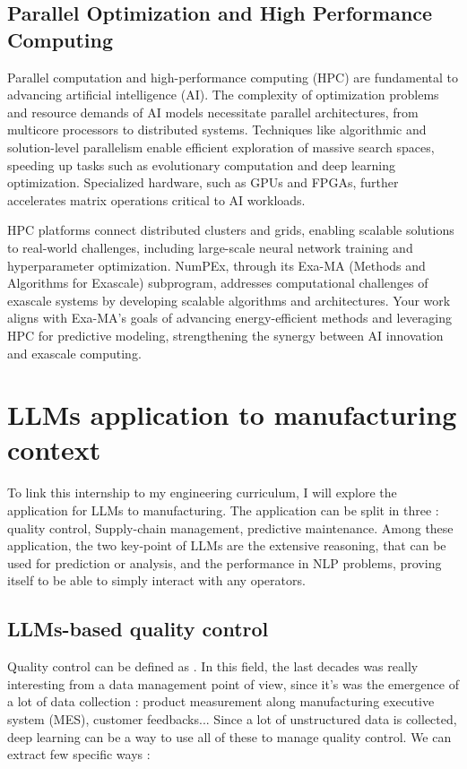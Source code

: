 \subsection{Parallel Optimization and High Performance Computing}

Parallel computation and high-performance computing (HPC) are fundamental to advancing artificial intelligence (AI). The complexity of optimization problems and resource demands of AI models necessitate parallel architectures, from multicore processors to distributed systems. Techniques like algorithmic and solution-level parallelism enable efficient exploration of massive search spaces, speeding up tasks such as evolutionary computation and deep learning optimization. Specialized hardware, such as GPUs and FPGAs, further accelerates matrix operations critical to AI workloads.

HPC platforms connect distributed clusters and grids, enabling scalable solutions to real-world challenges, including large-scale neural network training and hyperparameter optimization. NumPEx, through its Exa-MA (Methods and Algorithms for Exascale) subprogram, addresses computational challenges of exascale systems by developing scalable algorithms and architectures. Your work aligns with Exa-MA’s goals of advancing energy-efficient methods and leveraging HPC for predictive modeling, strengthening the synergy between AI innovation and exascale computing.


\section{LLMs application to manufacturing context}
\label{sec:llm_manufacturing}
To link this internship to my engineering curriculum, I will explore the application for LLMs to manufacturing. The application can be split in three : quality control, Supply-chain management, predictive maintenance. Among these application, the two key-point of LLMs are the extensive reasoning, that can be used for prediction or analysis, and the performance in NLP problems, proving itself to be able to simply interact with any operators.

\subsection{LLMs-based quality control}
\label{sec:llm_quality}
Quality control can be defined as  \cite{whatis_QC}. In this field, the last decades was really interesting from a data management point of view, since it's was the emergence of a lot of data collection : product measurement along manufacturing executive system (MES), customer feedbacks... Since a lot of unstructured data is collected, deep learning can be a way to use all of these to manage quality control. We can extract few specific ways : 

